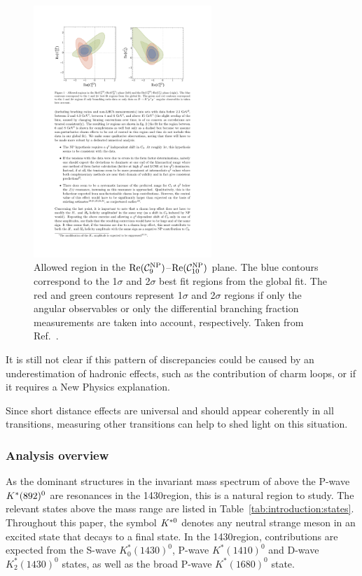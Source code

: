 \begin{figure}[!tb]
\centering
\includegraphics[trim={2.5cm 20cm 10.7cm 2.4cm},clip,width=0.6\textwidth]{figs/kpimm/introduction/c9c10.pdf}
\caption{Allowed region in the ${\rm Re}(\mathcal{C}_{9}^{\rm NP})$--${\rm Re}(\mathcal{C}_{10}^{\rm NP})$ plane. The blue contours correspond to the 1$\sigma$ and 2$\sigma$ best fit regions from the global fit. The red and green contours represent 1$\sigma$ and 2$\sigma$ regions if only the \BdToKstmmP angular observables or only the differential branching fraction measurements are taken into account, respectively. Taken from Ref.~\cite{straub}.}
\label{fig:kpimm:c9c10}
\end{figure}

It is still not clear if this pattern of discrepancies could be caused by an underestimation of hadronic effects, such as the contribution of charm loops, or if it requires a New Physics explanation.

Since short distance effects are universal and should appear coherently in all \btosmm transitions, measuring other \btosmm transitions can help to shed light on this situation.

\subsubsection{Analysis overview}

As the dominant structures in the \kpi invariant mass spectrum of \BdToKpimm above the P-wave ${{K}^*}(892)^{0}$ are resonances in the 1430\mevcc region, this is a natural region to study. The relevant \Kstarz states above the \KstP mass range are listed in Table~\ref{tab:introduction:states}. Throughout this paper, the symbol ${{K}^{*0}}$ denotes any neutral strange meson in an excited state that decays to a \Kp\pim final state. In the 1430\mevcc region, contributions are expected from the S-wave $K^\ast_0(1430)^0$, P-wave $K^\ast(1410)^0$ and D-wave $K^\ast_2(1430)^0$ states, as well as the broad P-wave $K^\ast(1680)^0$ state. 

